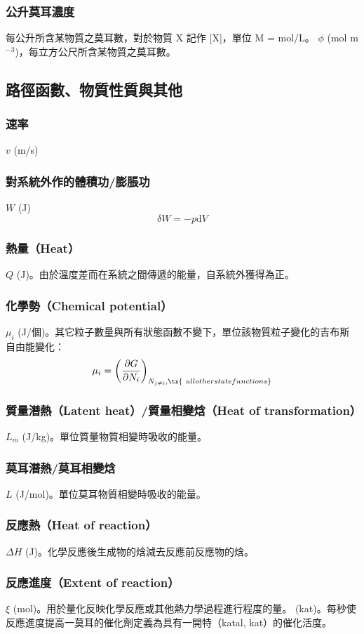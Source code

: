 \documentclass[a4paper,12pt]{report}
\begin{document}
\subsubsection{公升莫耳濃度}
每公升所含某物質之莫耳數，對於物質 X 記作 [X]，單位 M = mol/L。
$\phi$ (mol m$^{-3}$)，每立方公尺所含某物質之莫耳數。
\subsection{路徑函數、物質性質與其他}
\subsubsection{速率}
$v$ (m/s)
\subsubsection{對系統外作的體積功/膨脹功}
$W$ (J)
\[\delta W = -p\mathrm{d}V \]
\subsubsection{熱量（Heat）}
$Q$ (J)。由於溫度差而在系統之間傳遞的能量，自系統外獲得為正。
\subsubsection{化學勢（Chemical potential）}
\(\mu_i\) (J/個)。其它粒子數量與所有狀態函數不變下，單位該物質粒子變化的吉布斯自由能變化：
\[\mu _{i}=\left({\frac {\partial G}{\partial N_{i}}}\right)_{N_{j\neq i},\tx{\ all other state functions}}\]
\subsubsection{質量潛熱（Latent heat）/質量相變焓（Heat of transformation）}
$L_m$ (J/kg)。單位質量物質相變時吸收的能量。
\subsubsection{莫耳潛熱/莫耳相變焓}
$L$ (J/mol)。單位莫耳物質相變時吸收的能量。
\subsubsection{反應熱（Heat of reaction）}
$\Delta H$ (J)。化學反應後生成物的焓減去反應前反應物的焓。
\subsubsection{反應進度（Extent of reaction）}
$\xi$ (mol)。用於量化反映化學反應或其他熱力學過程進行程度的量。
(kat)。每秒使反應進度提高一莫耳的催化劑定義為具有一開特（katal, kat）的催化活度。
\end{document}
